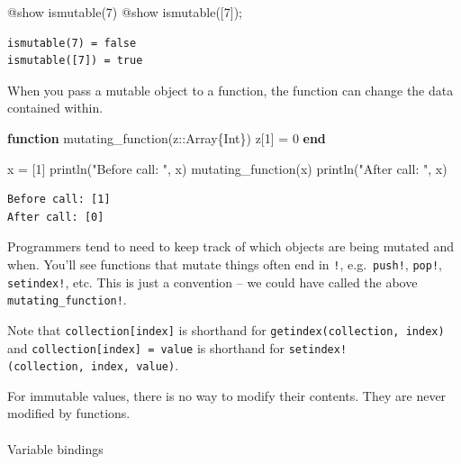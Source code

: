 \documentclass[
]{article}
\makeatletter
\let\oldparagraph\paragraph
\renewcommand{\paragraph}{
    \@ifstar
      \xxxParagraphStar
      \xxxParagraphNoStar
  }
\newcommand{\xxxParagraphStar}[1]{\oldparagraph*{#1}\mbox{}}
\newcommand{\xxxParagraphNoStar}[1]{\oldparagraph{#1}\mbox{}}
\newenvironment{Shaded}{\begin{snugshade}}{\end{snugshade}}
\newcommand{\DataTypeTok}[1]{\textcolor[rgb]{0.68,0.00,0.00}{#1}}
\newcommand{\FloatTok}[1]{\textcolor[rgb]{0.68,0.00,0.00}{#1}}
\newcommand{\FunctionTok}[1]{\textcolor[rgb]{0.28,0.35,0.67}{#1}}
\newcommand{\KeywordTok}[1]{\textcolor[rgb]{0.00,0.23,0.31}{\textbf{#1}}}
\newcommand{\NormalTok}[1]{\textcolor[rgb]{0.00,0.23,0.31}{#1}}
\newcommand{\OperatorTok}[1]{\textcolor[rgb]{0.37,0.37,0.37}{#1}}
\newcommand{\PreprocessorTok}[1]{\textcolor[rgb]{0.68,0.00,0.00}{#1}}
\newcommand{\StringTok}[1]{\textcolor[rgb]{0.13,0.47,0.30}{#1}}
\makeatother
\begin{document}
\begin{Shaded}
\begin{Highlighting}[]
\PreprocessorTok{@show} \FunctionTok{ismutable}\NormalTok{(}\FloatTok{7}\NormalTok{)}
\PreprocessorTok{@show} \FunctionTok{ismutable}\NormalTok{([}\FloatTok{7}\NormalTok{]);}
\end{Highlighting}
\end{Shaded}

\begin{verbatim}
ismutable(7) = false
ismutable([7]) = true
\end{verbatim}

When you pass a mutable object to a function, the function can change
the data contained within.

\begin{Shaded}
\begin{Highlighting}[]
\KeywordTok{function} \FunctionTok{mutating\_function}\NormalTok{(z}\OperatorTok{::}\DataTypeTok{Array\{Int\}}\NormalTok{) }
\NormalTok{   z[}\FloatTok{1}\NormalTok{] }\OperatorTok{=} \FloatTok{0}
\KeywordTok{end}

\NormalTok{x }\OperatorTok{=}\NormalTok{ [}\FloatTok{1}\NormalTok{]}
\FunctionTok{println}\NormalTok{(}\StringTok{"Before call: "}\NormalTok{, x)}
\FunctionTok{mutating\_function}\NormalTok{(x)}
\FunctionTok{println}\NormalTok{(}\StringTok{"After call: "}\NormalTok{, x)}
\end{Highlighting}
\end{Shaded}

\begin{verbatim}
Before call: [1]
After call: [0]
\end{verbatim}

Programmers tend to need to keep track of which objects are being
mutated and when. You'll see functions that mutate things often end in
\texttt{!}, e.g.~\texttt{push!}, \texttt{pop!}, \texttt{setindex!}, etc.
This is just a convention -- we could have called the above
\texttt{mutating\_function!}.

Note that \texttt{collection{[}index{]}} is shorthand for
\texttt{getindex(collection,\ index)} and
\texttt{collection{[}index{]}\ =\ value} is shorthand for
\texttt{setindex!(collection,\ index,\ value)}.

For immutable values, there is no way to modify their contents. They are
never modified by functions.

\paragraph{Variable bindings}\label{variable-bindings}
\end{document}
